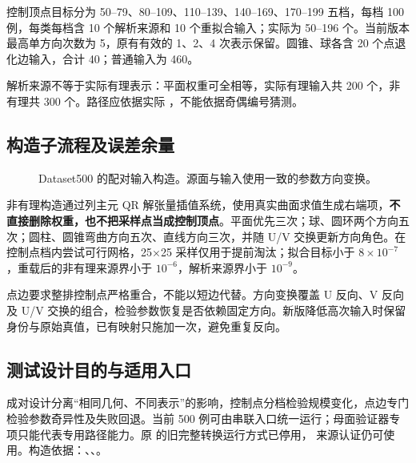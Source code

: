\documentclass[UTF8,zihao=5,fontset=windows,a4paper]{ctexart}
\newcommand{\code}[1]{\texttt{\detokenize{#1}}}
\begin{document}
控制顶点目标分为 50--79、80--109、110--139、140--169、170--199 五档，每档 100 例，每类每档含 10 个解析来源和 10 个重拟合输入；实际为 50--196 个。当前版本最高单方向次数为 5，原有有效的 1、2、4 次表示保留。圆锥、球各含 20 个点退化边输入，合计 40；普通输入为 460。

解析来源不等于实际有理表示：平面权重可全相等，实际有理输入共 200 个，非有理共 300 个。路径应依据实际 \code{IsRational()}，不能依据奇偶编号猜测。

\subsection{构造子流程及误差余量}
\begin{figure}[h]\centering
{}
\caption{Dataset500 的配对输入构造。源面与输入使用一致的参数方向变换。}
\end{figure}
非有理构造通过列主元 QR 解张量插值系统，使用真实曲面求值生成右端项，\textbf{不直接删除权重，也不把采样点当成控制顶点}。平面优先三次；球、圆环两个方向五次；圆柱、圆锥弯曲方向五次、直线方向三次，并随 U/V 交换更新方向角色。在控制点档内尝试可行网格，25×25 采样仅用于提前淘汰；拟合目标小于 $8\times10^{-7}$，重载后的非有理来源界小于 $10^{-6}$，解析来源界小于 $10^{-9}$。

点边要求整排控制点严格重合，不能以短边代替。方向变换覆盖 U 反向、V 反向及 U/V 交换的组合，检验参数恢复是否依赖固定方向。新版降低高次输入时保留身份与原始真值，已有映射只施加一次，避免重复反向。

\subsection{测试设计目的与适用入口}
成对设计分离“相同几何、不同表示”的影响，控制点分档检验规模变化，点边专门检验参数奇异性及失败回退。当前 500 例可由串联入口统一运行；母面验证器专项只能代表专用路径能力。原  的旧完整转换运行方式已停用，\code{--audit} 来源认证仍可使用。构造依据：、、。
\end{document}
